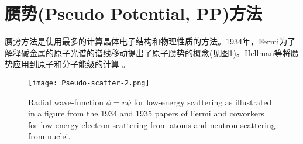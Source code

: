 \section{赝势(Pseudo Potential, PP)方法}
赝势方法是使用最多的计算晶体电子结构和物理性质的方法。1934年，Fermi为了解释碱金属的原子光谱的谱线移动提出了原子赝势的概念(见图\ref{Pseudo-scatter-2})\cite{nc11-157_1934,ajp52-695_1984}。Hellman等将赝势应用到原子和分子能级的计算%
。
\begin{figure}[h!]
\centering
\vspace*{-0.25in}
\texttt{[image: Pseudo-scatter-2.png]}
\caption{{\textrm{Radial wave-function $\phi=r\psi$ for low-energy scattering as illustrated in a figure from the 1934 and 1935 papers of Fermi and coworkers for low-energy electron scattering from atoms and neutron scattering from nuclei.}}}%
\label{Pseudo-scatter-2}
\end{figure}

